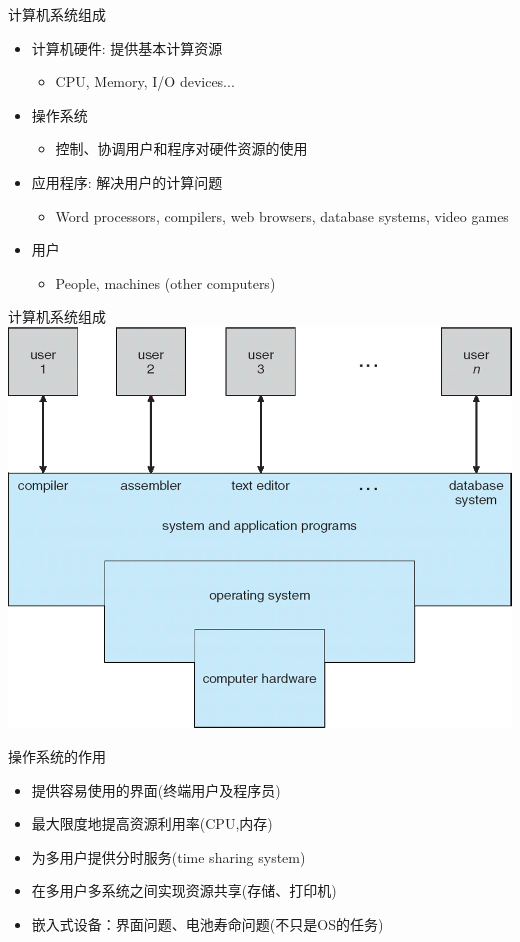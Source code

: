 \documentclass[xcolor=svgnames]{beamer}
\begin{document}
\begin{CJK*}{UTF8}{gbsn}
\begin{frame}{计算机系统组成}
\begin{itemize}
\item 计算机硬件: 提供基本计算资源
\begin{itemize}
\item CPU, Memory, I/O devices...
\end{itemize}
\item 操作系统
\begin{itemize}
\item 控制、协调用户和程序对硬件资源的使用
\end{itemize}
\item 应用程序: 解决用户的计算问题
\begin{itemize}
\item Word processors, compilers, web browsers, database
systems, video games
\end{itemize}
\item 用户
\begin{itemize}
\item People, machines (other computers)
\end{itemize}
\end{itemize}
\end{frame}

\begin{frame}{计算机系统组成}
\includegraphics[width=.9\textwidth]{system.png}
\end{frame}

\begin{frame}{操作系统的作用}
\begin{itemize}
\item 提供容易使用的界面(终端用户及程序员)
\item 最大限度地提高资源利用率(CPU,内存)
\item 为多用户提供分时服务(time sharing system)
\item 在多用户多系统之间实现资源共享(存储、打印机)
\item 嵌入式设备：界面问题、电池寿命问题(不只是OS的任务)
\end{itemize}
\end{frame}


\end{CJK*}
\end{document}
